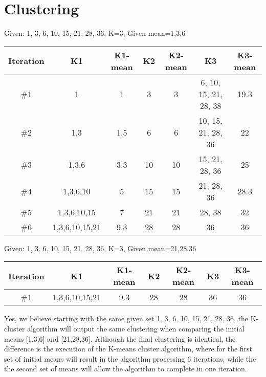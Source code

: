 \documentclass[11pt]{article}
\begin{document}
\section{Clustering}
Given: {1, 3, 6, 10, 15, 21, 28, 36}, K=3, Given mean={1},{3},{6}\\

\begin {tabular}{c|c c|c c|c c}
Iteration & K1 & K1-mean & K2 & K2-mean & K3 & K3-mean\\
\hline
\#1 & {1} & {1} & {3} & {3} & {6, 10, 15, 21, 28, 38} & {19.3} \\
\hline
\#2 & {1,3} & {1.5} & {6} & {6} & {10, 15, 21, 28, 36} & {22} \\
\hline
\#3 & {1,3,6} & {3.3} & {10} & {10} & {15, 21, 28, 36} & {25} \\
\hline
\#4 & {1,3,6,10} & {5} & {15} & {15} & {21, 28, 36} & {28.3} \\
\hline
\#5 & {1,3,6,10,15} & {7} & {21} & {21} & {28, 38} & {32} \\
\hline
\#6 & {1,3,6,10,15,21} & {9.3} & {28} & {28} & {36} & {36} \\
\end{tabular}
\newline

Given: {1, 3, 6, 10, 15, 21, 28, 36}, K=3, Given mean={21},{28},{36} \\

\begin {tabular}{c|c c|c c|c c}
Iteration & K1 & K1-mean & K2 & K2-mean & K3 & K3-mean\\
\hline
\#1 & {1,3,6,10,15,21} & {9.3} & {28} & {28} & {36} & {36} \\
\end{tabular}
\newline

Yes, we believe starting with the same given set {1, 3, 6, 10, 15, 21, 28, 36}, the K-cluster algorithm will output the same clustering when comparing the initial means [{1},{3},{6}] and [{21},{28},{36}]. Although the final clustering is identical, the difference is the execution of the K-means cluster algorithm, where for the first set of initial means will result in the algorithm processing 6 iterations, while the the second set of means will allow the algorithm to complete in one iteration.
\end{document}
